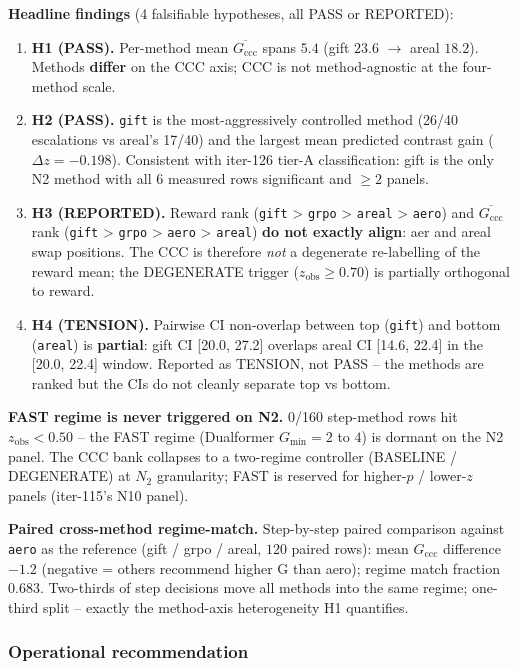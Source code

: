 \documentclass{article}
\begin{document}
\textbf{Headline findings}
(4 falsifiable hypotheses, all PASS or REPORTED):

\begin{enumerate}
\item \textbf{H1 (PASS).}  Per-method mean $\overline{G_{\mathrm{ccc}}}$
spans $5.4$ (gift $23.6$ $\to$ areal $18.2$).  Methods
\textbf{differ} on the CCC axis; CCC is not method-agnostic at the
four-method scale.
\item \textbf{H2 (PASS).}  \texttt{gift} is the most-aggressively
controlled method (26/40 escalations vs areal's 17/40) and the
largest mean predicted contrast gain ($\Delta z = -0.198$).  Consistent
with iter-126 tier-A classification: gift is the only N2 method with
all 6 measured rows significant and $\geq 2$ panels.
\item \textbf{H3 (REPORTED).}  Reward rank (\texttt{gift} > \texttt{grpo}
> \texttt{areal} > \texttt{aero}) and $\overline{G_{\mathrm{ccc}}}$ rank
(\texttt{gift} > \texttt{grpo} > \texttt{aero} > \texttt{areal})
\textbf{do not exactly align}: aer and areal swap positions.  The CCC
is therefore \emph{not} a degenerate re-labelling of the reward mean;
the DEGENERATE trigger ($z_{\mathrm{obs}}\geq 0.70$) is partially
orthogonal to reward.
\item \textbf{H4 (TENSION).}  Pairwise CI non-overlap between top
(\texttt{gift}) and bottom (\texttt{areal}) is
\textbf{partial}: gift CI [20.0, 27.2] overlaps areal CI [14.6, 22.4]
in the [20.0, 22.4] window.  Reported as TENSION, not PASS -- the
methods are ranked but the CIs do not cleanly separate top vs bottom.
\end{enumerate}

\textbf{FAST regime is never triggered on N2.}  0/160 step-method rows
hit $z_{\mathrm{obs}}<0.50$ -- the FAST regime (Dualformer
$G_{\min}{=}2$ to $4$) is dormant on the N2 panel.  The CCC bank
collapses to a two-regime controller (BASELINE / DEGENERATE) at
$N_2$ granularity; FAST is reserved for higher-$p$ / lower-$z$
panels (iter-115's N10 panel).

\textbf{Paired cross-method regime-match.}  Step-by-step paired
comparison against \texttt{aero} as the reference (gift / grpo /
areal, $120$ paired rows): mean $G_{\mathrm{ccc}}$ difference
$-1.2$ (negative = others recommend higher G than aero); regime
match fraction 0.683.  Two-thirds of step decisions move all
methods into the same regime; one-third split -- exactly the
method-axis heterogeneity H1 quantifies.

\subsubsection*{Operational recommendation}
\end{document}
